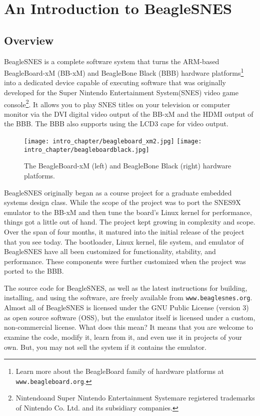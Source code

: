 \chapter{An Introduction to BeagleSNES}

\section{Overview}

BeagleSNES is a complete software system that turns the ARM-based BeagleBoard-xM (BB-xM) and BeagleBone Black (BBB) hardware platforms\footnote{Learn more about the BeagleBoard family of hardware platforms at \texttt{www.beagleboard.org}.} into a dedicated device capable of executing software that was originally developed for the Super Nintendo Entertainment System\textregistered  (SNES) video game console\footnote{Nintendo\textregistered and Super Nintendo Entertainment System\textregistered are registered trademarks of Nintendo Co. Ltd. and its subsidiary companies.}.  It allows you to play SNES titles on your television or computer monitor via the DVI digital video output of the BB-xM and the HDMI output of the BBB. The BBB also supports using the LCD3 cape for video output. 

\begin{figure}[h]
\centering\texttt{[image: intro\_chapter/beagleboard\_xm2.jpg]} 
\texttt{[image: intro\_chapter/beagleboardblack.jpg]} 
\caption{The BeagleBoard-xM (left) and BeagleBone Black (right) hardware platforms.}
\end{figure}

BeagleSNES originally began as a course project for a graduate embedded systems design class.  While the scope of the project was to port the SNES9X emulator to the BB-xM and then tune the board's Linux kernel for performance, things got a little out of hand.  The project kept growing in complexity and scope.  Over the span of four months, it matured into the initial release of the project that you see today.  The bootloader, Linux kernel, file system, and emulator of BeagleSNES have all been customized for functionality, stability, and performance.  These components were further customized when the project was ported to the BBB.

The source code for BeagleSNES, as well as the latest instructions for building, installing, and using the software, are freely available from \texttt{www.beaglesnes.org}.  Almost all of BeagleSNES is licensed under the GNU Public License (version 3) as open source software (OSS), but the emulator itself is licensed under a custom, non-commercial license.  What does this mean?  It means that you are welcome to examine the code, modify it, learn from it, and even use it in projects of your own.  But, you may not sell the system if it contains the emulator. 

